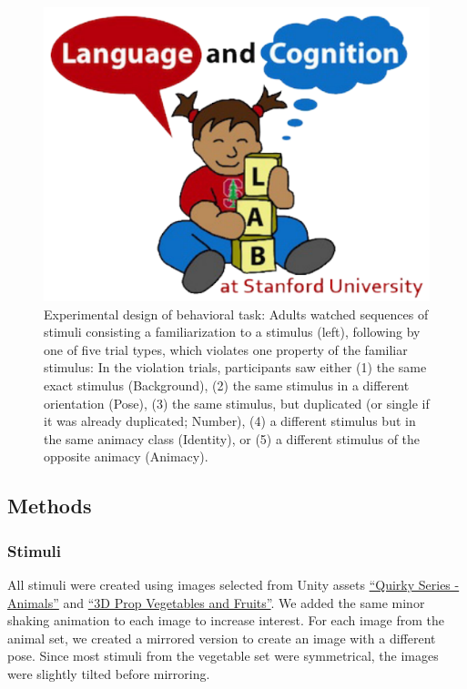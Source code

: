 \documentclass[10pt, letterpaper]{article}
\newenvironment{CodeChunk}{}{}
\begin{document}
\begin{CodeChunk}
\begin{figure}[H]

{\centering \includegraphics{figs/design_fig-1} 

}

\caption[Experimental design of behavioral task]{Experimental design of behavioral task: Adults watched sequences of stimuli consisting a familiarization to a stimulus (left), following by one of five trial types, which violates one property of the familiar stimulus: In the violation trials, participants saw either (1) the same exact stimulus (Background), (2) the same stimulus in a different orientation (Pose), (3) the same stimulus, but duplicated (or single if it was already duplicated; Number), (4) a different stimulus but in the same animacy class (Identity), or (5) a different stimulus of the opposite animacy (Animacy).}\label{fig:design_fig}
\end{figure}
\end{CodeChunk}

\hypertarget{methods}{%
\subsection{Methods}\label{methods}}

\hypertarget{stimuli}{%
\subsubsection{Stimuli}\label{stimuli}}

All stimuli were created using images selected from Unity assets
\href{https://assetstore.unity.com/packages/3d/characters/animals/quirky-series-animals-mega-pack-vol-2-183280}{``Quirky
Series - Animals''} and
\href{https://assetstore.unity.com/packages/3d/props/food/3d-prop-vegetables-and-fruits-237790}{``3D
Prop Vegetables and Fruits''}. We added the same minor shaking animation
to each image to increase interest. For each image from the animal set,
we created a mirrored version to create an image with a different pose.
Since most stimuli from the vegetable set were symmetrical, the images
were slightly tilted before mirroring.
\end{document}
